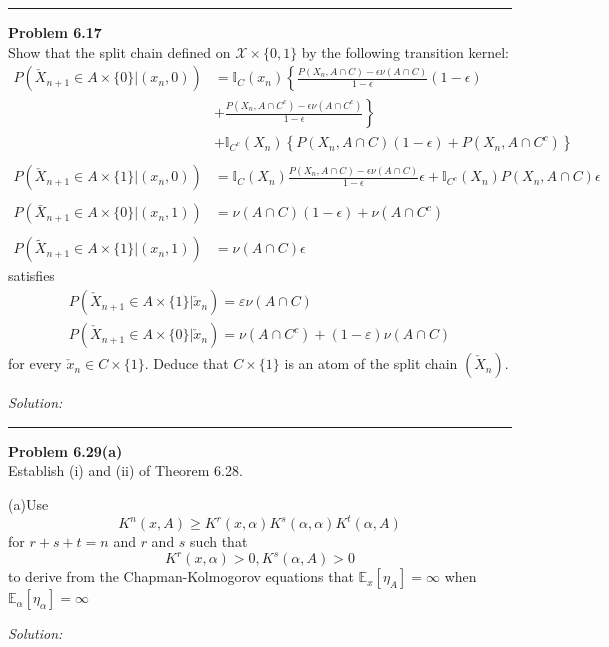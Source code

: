 \documentclass[a4paper, 11pt]{article}
\newenvironment{problem}[2][Problem]
    { \begin{mdframed}[backgroundcolor=gray!20] \textbf{#1 #2} \\}
    {  \end{mdframed}}
\newenvironment{solution}
    {\textit{Solution:}}
    {}
\begin{document}
\noindent\rule{7in}{2.8pt}
\begin{problem}{6.17}
Show that the split chain defined on $\mathcal{X} \times\{0,1\}$ by the following transition kernel: 
\begin{align*}
    P\left(\check{X}_{n+1} \in A \times\{0\} |\left(x_{n}, 0\right)\right) 
    &=\mathbb{I}_{C}\left(x_{n}\right)\left\{\frac{P\left(X_{n}, A \cap C\right)-\epsilon \nu(A \cap C)}{1-\epsilon}(1-\epsilon)\right. \\
    &\left.+\frac{P\left(X_{n}, A \cap C^{c}\right)-\epsilon \nu\left(A \cap C^{c}\right)}{1-\epsilon}\right\} \\
    &+\mathbb{I}_{C^{c}}\left(X_{n}\right)\left\{P\left(X_{n}, A \cap C\right)(1-\epsilon)+P\left(X_{n}, A \cap C^{c}\right)\right\} \\
    \\
    P\left(\check{X}_{n+1} \in A \times\{1\} |\left(x_{n}, 0\right)\right)
    &=\mathbb{I}_{C}\left(X_{n}\right) \frac{P\left(X_{n}, A \cap C\right)-\epsilon \nu(A \cap C)}{1-\epsilon} \epsilon+\mathbb{I}_{C^{c}}\left(X_{n}\right) P\left(X_{n}, A \cap C\right) \epsilon \\
    \\
    P\left(\bar{X}_{n+1} \in A \times\{0\} |\left(x_{n}, 1\right)\right)&=\nu(A \cap C)(1-\epsilon)+\nu\left(A \cap C^{c}\right) \\
    \\
    P\left(\tilde{X}_{n+1} \in A \times\{1\} |\left(x_{n}, 1\right)\right)&=\nu(A \cap C) \epsilon
\end{align*}
satisfies
$$\begin{array}{c}
    P\left(\check{X}_{n+1} \in A \times\{1\} | \check{x}_{n}\right)=\varepsilon \nu(A \cap C) \\
    P\left(\check{X}_{n+1} \in A \times\{0\} | \check{x}_{n}\right)=\nu\left(A \cap C^{c}\right)+(1-\varepsilon) \nu(A \cap C)
    \end{array}$$
for every $\check{x}_{n} \in C \times\{1\} .$ Deduce that $C \times\{1\}$ is an atom of the split chain $\left(\check{X}_{n}\right)$.
\end{problem}
\begin{solution}

\end{solution}

\noindent\rule{7in}{2.8pt}
\begin{problem}{6.29(a)}
Establish (i) and (ii) of Theorem 6.28. 

(a)Use
$$K^{n}(x, A) \geq K^{r}(x, \alpha) K^{s}(\alpha, \alpha) K^{t}(\alpha, A)$$
for $r+s+t=n$ and $r$ and $s$ such that
$$K^r(x,\alpha)>0,K^s(\alpha,A)>0$$
to derive from the Chapman-Kolmogorov equations that $\mathbb{E}_{x}\left[\eta_{A}\right]=\infty$ when $\mathbb{E}_{\alpha}\left[\eta_{\alpha}\right]=\infty$
\end{problem}
\begin{solution}

\end{solution}
\end{document}

